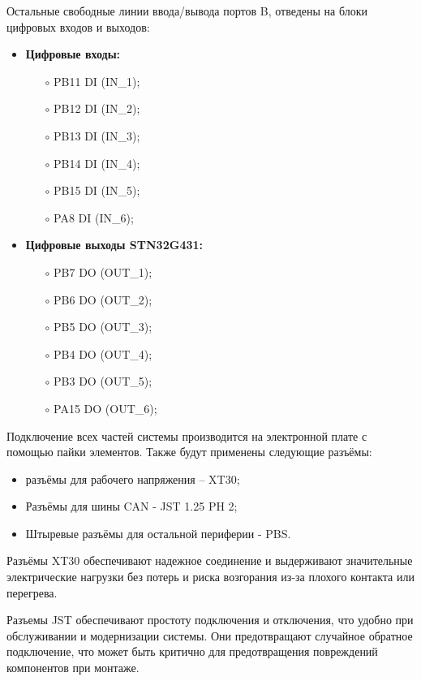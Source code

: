 Остальные свободные линии ввода/вывода портов B, отведены на блоки цифровых входов и выходов:
\begin{itemize}
	\item \textbf{Цифровые входы:}
	      \begin{itemize}
		      \item[$\circ$] PB11 \leftarrow DI (IN\_1);
		      \item[$\circ$] PB12 \leftarrow DI (IN\_2);
		      \item[$\circ$] PB13 \leftarrow DI (IN\_3);
		      \item[$\circ$] PB14 \leftarrow DI (IN\_4);
		      \item[$\circ$] PB15 \leftarrow DI (IN\_5);
		      \item[$\circ$] PA8 \leftarrow DI (IN\_6);
	      \end{itemize}
	\item \textbf{Цифровые выходы STN32G431:}
	      \begin{itemize}
		      \item[$\circ$] PB7 \rightarrow DO (OUT\_1);
		      \item[$\circ$] PB6 \rightarrow DO (OUT\_2);
		      \item[$\circ$] PB5 \rightarrow DO (OUT\_3);
		      \item[$\circ$] PB4 \rightarrow DO (OUT\_4);
		      \item[$\circ$] PB3 \rightarrow DO (OUT\_5);
		      \item[$\circ$] PA15 \rightarrow DO (OUT\_6);
	      \end{itemize}
\end{itemize}

Подключение всех частей системы производится на электронной плате с помощью пайки элементов. Также будут применены следующие разъёмы:
\begin{itemize}
	\item разъёмы для рабочего напряжения – XT30;
	\item Разъёмы для шины CAN - JST 1.25 PH 2;
	\item Штыревые разъёмы для остальной периферии - PBS.
\end{itemize}

Разъёмы XT30 обеспечивают надежное соединение и выдерживают значительные электрические нагрузки без потерь и риска возгорания из-за плохого контакта или перегрева.

Разъемы JST обеспечивают простоту подключения и отключения, что удобно при обслуживании и модернизации системы. Они предотвращают случайное обратное подключение, что может быть критично для предотвращения повреждений компонентов при монтаже.


